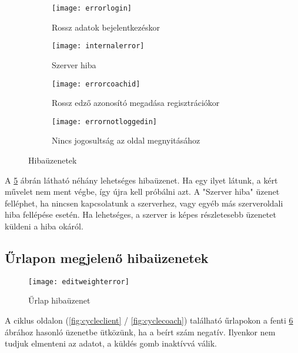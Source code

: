 \begin{figure}[htbp]
	\centering
	\begin{subfigure}[b]{0.3\textwidth}
		\centering
		\texttt{[image: errorlogin]}
		\caption{Rossz adatok bejelentkezéskor}
		\label{fig:errorlogin}
	\end{subfigure}
	\hfill
	\begin{subfigure}[b]{0.3\textwidth}
		\centering
		\texttt{[image: internalerror]}
		\caption{Szerver hiba}
		\label{fig:internalerror}
	\end{subfigure}
	\hfill
	\begin{subfigure}[b]{0.3\textwidth}
		\centering
		\texttt{[image: errorcoachid]}
		\caption{Rossz edző azonosító megadása regisztrációkor}
		\label{fig:errorcoachid}
	\end{subfigure}
	\hfill
	\begin{subfigure}[b]{0.4\textwidth}
		\centering
		\texttt{[image: errornotloggedin]}
		\caption{Nincs jogosultság az oldal megnyitásához}
		\label{fig:errornotloggedin}
	\end{subfigure}
	
	\caption{Hibaüzenetek}
	\label{fig:hiba}
\end{figure}

A \ref{fig:hiba} ábrán látható néhány lehetséges hibaüzenet. Ha egy ilyet látunk, a kért művelet nem ment végbe, így újra kell próbálni azt. A "Szerver hiba" üzenet felléphet, ha nincsen kapcsolatunk a szerverhez, vagy egyéb más szerveroldali hiba fellépése esetén. Ha lehetséges, a szerver is képes részletesebb üzenetet küldeni a hiba okáról.

\subsection{Űrlapon megjelenő hibaüzenetek}

\begin{figure}[H]
	\centering
	\texttt{[image: editweighterror]}
	\caption{Űrlap hibaüzenet}
	\label{fig:editweighterror}
\end{figure}

A ciklus oldalon (\ref{fig:cycleclient} / \ref{fig:cyclecoach}) található űrlapokon a fenti \ref{fig:editweighterror} ábrához hasonló üzenetbe ütközünk, ha a beírt szám negatív. Ilyenkor nem tudjuk elmenteni az adatot, a küldés gomb inaktívvá válik.